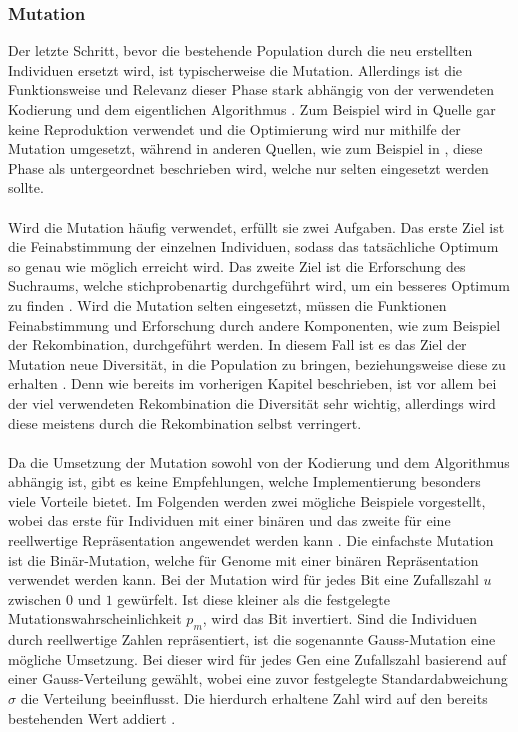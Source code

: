 \subsubsection{Mutation}
\label{subsubsec:ea_mutation}
Der letzte Schritt, bevor die bestehende Population durch die neu erstellten Individuen ersetzt wird, ist typischerweise die Mutation. Allerdings ist die Funktionsweise und Relevanz dieser Phase stark abhängig von der verwendeten Kodierung und dem eigentlichen Algorithmus \cite{weicker2015evolutionare}. Zum Beispiel wird in Quelle \cite{such2017deep} gar keine Reproduktion verwendet und die Optimierung wird nur mithilfe der Mutation umgesetzt, während in anderen Quellen, wie zum Beispiel in \cite{zoller2007kunstliche}, diese Phase als untergeordnet beschrieben wird, welche nur selten eingesetzt werden sollte.
\\\\
Wird die Mutation häufig verwendet, erfüllt sie zwei Aufgaben. Das erste Ziel ist die Feinabstimmung der einzelnen Individuen, sodass das tatsächliche Optimum so genau wie möglich erreicht wird. Das zweite Ziel ist die Erforschung des Suchraums, welche stichprobenartig durchgeführt wird, um ein besseres Optimum zu finden \cite{weicker2015evolutionare}.  Wird die Mutation selten eingesetzt, müssen die Funktionen Feinabstimmung und Erforschung durch andere Komponenten, wie zum Beispiel der Rekombination, durchgeführt werden. In diesem Fall ist es das Ziel der Mutation neue Diversität, in die Population zu bringen, beziehungsweise diese zu erhalten \cite{weicker2015evolutionare}. Denn wie bereits im vorherigen Kapitel beschrieben, ist vor allem bei der viel verwendeten Rekombination die Diversität sehr wichtig, allerdings wird diese meistens durch die Rekombination selbst verringert.
\\\\
Da die Umsetzung der Mutation sowohl von der Kodierung und dem Algorithmus abhängig ist, gibt es keine Empfehlungen, welche Implementierung besonders viele Vorteile bietet. Im Folgenden werden zwei mögliche Beispiele vorgestellt, wobei das erste für Individuen mit einer binären und das zweite für eine reellwertige Repräsentation angewendet werden kann \cite{weicker2015evolutionare}. Die einfachste Mutation ist die Binär-Mutation, welche für Genome mit einer binären Repräsentation verwendet werden kann. Bei der Mutation wird für jedes Bit eine Zufallszahl $u$ zwischen $0$ und $1$ gewürfelt. Ist diese kleiner als die festgelegte Mutationswahrscheinlichkeit $p_m$, wird das Bit invertiert. Sind die Individuen durch reellwertige Zahlen repräsentiert, ist die sogenannte Gauss-Mutation eine mögliche Umsetzung. Bei dieser wird für jedes Gen eine Zufallszahl basierend auf einer Gauss-Verteilung gewählt, wobei eine zuvor festgelegte Standardabweichung $\sigma$ die Verteilung beeinflusst. Die hierdurch erhaltene Zahl wird auf den bereits bestehenden Wert addiert \cite{weicker2015evolutionare}.

